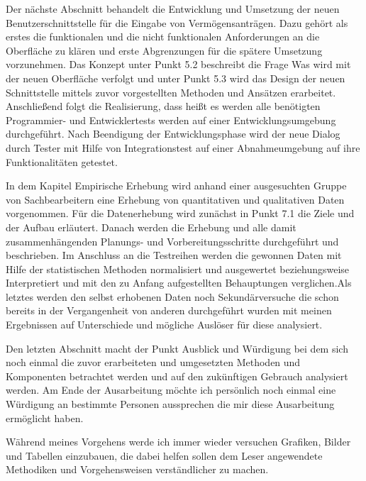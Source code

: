 Der nächste Abschnitt behandelt die \glqq Entwicklung und Umsetzung der neuen Benutzerschnittstelle\grqq{} für die Eingabe von Vermögensanträgen. Dazu gehört als erstes die funktionalen und die nicht funktionalen Anforderungen an die Oberfläche zu klären und erste Abgrenzungen für die spätere Umsetzung vorzunehmen. Das Konzept unter Punkt 5.2 beschreibt die Frage \glqq Was\grqq{} wird mit der neuen Oberfläche verfolgt und unter Punkt 5.3 wird das Design der neuen Schnittstelle mittels zuvor vorgestellten Methoden und Ansätzen erarbeitet. Anschließend folgt die Realisierung, dass heißt es werden alle benötigten Programmier- und Entwicklertests werden auf einer Entwicklungsumgebung durchgeführt. Nach Beendigung der Entwicklungsphase wird der neue Dialog durch Tester mit Hilfe von Integrationstest auf einer Abnahmeumgebung auf ihre Funktionalitäten getestet.

In dem Kapitel \glqq Empirische Erhebung\grqq{} wird anhand einer ausgesuchten Gruppe von Sachbearbeitern eine Erhebung von quantitativen und qualitativen Daten vorgenommen. Für die Datenerhebung wird zunächst in Punkt 7.1 die Ziele und der Aufbau erläutert. Danach werden die Erhebung und alle damit zusammenhängenden Planungs- und Vorbereitungsschritte durchgeführt und beschrieben. Im Anschluss an die Testreihen werden die gewonnen Daten mit Hilfe der statistischen Methoden normalisiert und ausgewertet beziehungsweise Interpretiert und mit den zu Anfang aufgestellten Behauptungen verglichen.Als letztes werden den selbst erhobenen Daten noch Sekundärversuche die schon bereits in der Vergangenheit von anderen durchgeführt wurden mit meinen Ergebnissen auf Unterschiede und mögliche Auslöser für diese analysiert.

Den letzten Abschnitt macht der Punkt \glqq Ausblick und Würdigung\glqq{} bei dem sich noch einmal die zuvor erarbeiteten und umgesetzten Methoden und Komponenten betrachtet werden und auf den zukünftigen Gebrauch analysiert werden. Am Ende der Ausarbeitung möchte ich persönlich noch einmal eine Würdigung an bestimmte Personen aussprechen die mir diese Ausarbeitung ermöglicht haben.

Während meines Vorgehens werde ich immer wieder versuchen Grafiken, Bilder und Tabellen einzubauen, die dabei helfen sollen dem Leser angewendete Methodiken und Vorgehensweisen verständlicher zu machen.




